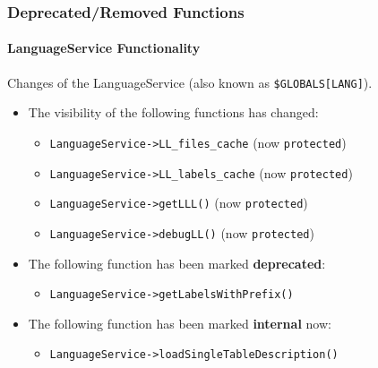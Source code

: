 
\begin{frame}[fragile]
	\frametitle{Deprecated/Removed Functions}
	\framesubtitle{LanguageService Functionality}

	Changes of the LanguageService (also known as \texttt{\$GLOBALS[LANG]}).
	\vspace{0.4cm}
	\begin{itemize}
		\item The visibility of the following functions has changed:
			\begin{itemize}\smaller
				\item \texttt{LanguageService->LL\_files\_cache} (now \texttt{protected})
				\item \texttt{LanguageService->LL\_labels\_cache} (now \texttt{protected})
				\item \texttt{LanguageService->getLLL()} (now \texttt{protected})
				\item \texttt{LanguageService->debugLL()} (now \texttt{protected})
			\end{itemize}\normalsize
			\vspace{0.2cm}

		\item The following function has been marked \textbf{deprecated}:
			\begin{itemize}\smaller
				\item \texttt{LanguageService->getLabelsWithPrefix()}
			\end{itemize}\normalsize
			\vspace{0.2cm}

		\item The following function has been marked \textbf{internal} now:
			\begin{itemize}\smaller
				\item \texttt{LanguageService->loadSingleTableDescription()}
			\end{itemize}\normalsize
			\vspace{0.2cm}

	\end{itemize}

\end{frame}


